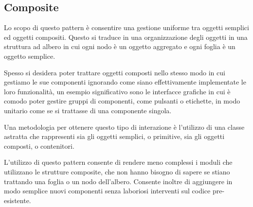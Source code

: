 \subsection{Composite}
\label{sub:composite}
Lo scopo di questo pattern è consentire una gestione uniforme tra oggetti semplici ed oggetti compositi. Questo si traduce in una organizzazione degli oggetti in una struttura ad albero in cui ogni nodo è un oggetto aggregato e ogni foglia è un oggetto semplice.

Spesso si desidera poter trattare oggetti composti nello stesso modo in cui gestiamo le sue componenti ignorando come siano effettivamente implementate le loro funzionalità, un esempio significativo sono le interfacce grafiche in cui è comodo poter gestire gruppi di componenti, come pulsanti o etichette, in modo unitario come se si trattasse di una componente singola.

Una metodologia per ottenere questo tipo di interazione è l'utilizzo di una classe astratta che rappresenti sia gli oggetti semplici, o primitive, sia gli oggetti composti, o contenitori.

L'utilizzo di questo pattern consente di rendere meno complessi i moduli che utilizzano le strutture composite, che non hanno bisogno di sapere se stiano trattando una foglia o un nodo dell'albero. Consente inoltre di aggiungere in modo semplice nuovi componenti senza laboriosi interventi sul codice pre-esistente.
